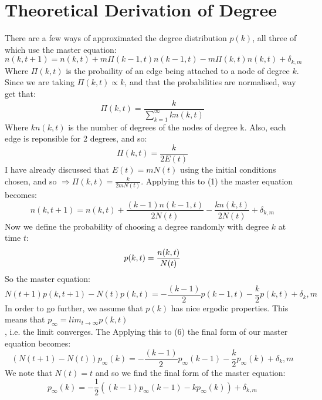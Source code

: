\documentclass[]{article}
\begin{document}
\section{Theoretical Derivation of Degree}

There are a few ways of approximated the degree distribution $p(k)$, all three of which use the master equation: 
\begin{equation}
n(k,t+1)=n(k,t)+m\Pi(k-1,t)n(k-1,t)-m\Pi(k,t)n(k,t)+\delta_{k,m}
\end{equation}
Where $\Pi(k,t)$ is the probaility of an edge being attached to a node of degree $k$.
Since we are taking $\Pi(k,t) \propto k$, and that the probabilities are normalised, way get that:
\begin{equation}
\Pi(k,t)=\frac{k}{\sum_{k=1}^{\infty}{kn(k,t)}}
\end{equation}
Where $kn(k,t)$ is the number of degrees of the nodes of degree k. Also, each edge is reponsible for 2 degrees, and so:
\begin{equation}
\Pi(k,t)=\frac{k}{2E(t)}
\end{equation}
I have already discussed that $E(t)=mN(t)$ using the initial conditions chosen, and so $\Rightarrow \Pi(k,t)=\frac{k}{2mN(t)}$. Applying this to (1) the master equation becomes:
\begin{equation}
n(k,t+1)=n(k,t)+\frac{(k-1)n(k-1,t)}{2N(t)}-\frac{kn(k,t)}{2N(t)}+\delta_{k,m}
\end{equation}
Now we define the probability of choosing a degree randomly with degree $k$ at time $t$: 
\begin{equation}
p(k,t)=\frac{n(k,t)}{N(t)}\\
\end{equation}
So the master equation:
\begin{equation}
N(t+1)p(k,t+1)-N(t)p(k,t)=-\frac{(k-1)}{2}p(k-1,t)-\frac{k}{2}p(k,t)+ \delta_k,m
\end{equation}
In order to go further, we assume that $p(k)$ has nice ergodic properties. This means that $p_{\infty}=lim_{t \rightarrow \infty} p(k,t)$\\, i.e. the limit converges. The Applying this to (6) the final form of our master equation becomes:
\begin{equation}
(N(t+1)-N(t))p_{\infty}(k)=-\frac{(k-1)}{2}p_{\infty}(k-1)-\frac{k}{2}p_{\infty}(k)+ \delta_k,m
\end{equation}
We note that $N(t)=t$  and so we find the final form of the master equation:
\begin{equation}
p_{\infty}(k)=-\frac{1}{2}((k-1)p_{\infty}(k-1)-kp_{\infty}(k)) +\delta_{k,m}
\end{equation}
\end{document}
